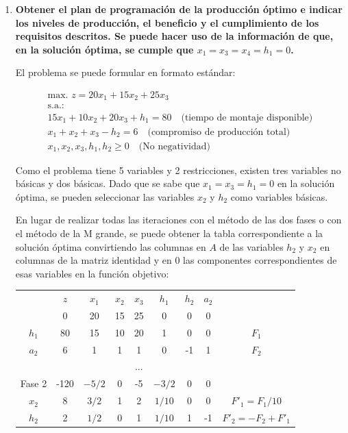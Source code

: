 \begin{enumerate}

    \item \textbf{Obtener el plan de programación de la producción óptimo e indicar los niveles de producción, el beneficio y el cumplimiento de los requisitos descritos. Se puede hacer uso de la información de que, en la solución óptima, se cumple que $x_1=x_3=x_4=h_1=0$.} 

    El problema se puede formular en formato estándar:

    \begin{equation}
\begin{split}
\text{max. } z = 20x_1 + 15x_2 + 25x_3 \\
\text{s.a.:} \\
15x_1 + 10x_2 + 20x_3 + h_1 = 80 \quad \text{(tiempo de montaje disponible)} \\
x_1 + x_2 + x_3 - h_2 = 6 \quad \text{(compromiso de producción total)} \\
x_1, x_2, x_3, h_1, h_2 \geq 0 \quad \text{(No negatividad)}
\end{split}
\end{equation}

    Como el problema tiene 5 variables y 2 restricciones, existen tres variables no básicas y dos básicas. Dado que se sabe que $x_1=x_3=h_1=0$ en la solución óptima, se pueden seleccionar las variables $x_2$ y $h_2$ como variables básicas.

    En lugar de realizar todas las iteraciones con el método de las dos fases o con el método de la M grande, se puede obtener la tabla correspondiente a la solución óptima convirtiendo las columnas en $A$ de las variables $h_2$ y $x_2$ en columnas de la matriz identidad y en 0 las componentes correspondientes de esas variables en la función objetivo:


    \begin{center}
    \begin{tabular}{c|c|cccccc|c}
     & $z$ & $x_1$ & $x_2$ & $x_3$ & $h_1$ & $h_2$ & $a_2$ & \\   
     & 0 & 20 & 15 & 25 & 0 & 0 & 0 & \\ 
    \hline
    $h_1$ & 80  & 15 & 10 & 20 & 1 & 0 & 0 & $F_1$\\ 
    $a_2$ & 6  & 1 & 1 & 1 & 0 & -1 & 1& $F_2$\\ 
    \hline
    & & & & ... & & & &\\
    \hline
    Fase 2 & -120 & $-5/2$ & 0 & -5 & $-3/2$ & 0 & 0 & \\ 
    \hline
    $x_2$ & 8  & $3/2$ & 1 & 2 & $1/10$ & 0 & 0 & $F'_1 = F_1/10$\\ 
    $h_2$ & 2  & $1/2$ & 0 & 1 & $1/10$ & 1 & -1 & $F'_2 = -F_2 + F'_1$ \\ 
    \hline
    \end{tabular}
    \end{center}   


\end{enumerate}

